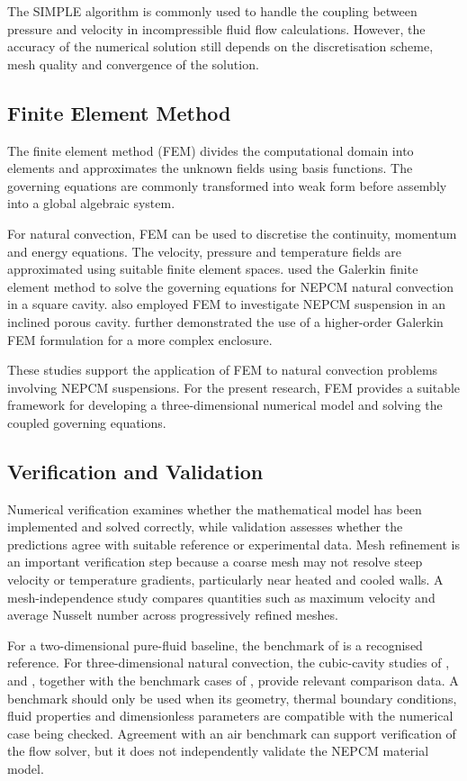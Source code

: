 The SIMPLE algorithm is commonly used to handle the coupling between pressure and velocity in incompressible fluid flow calculations. However, the accuracy of the numerical solution still depends on the discretisation scheme, mesh quality and convergence of the solution.

\subsection{Finite Element Method}

The finite element method (FEM) divides the computational domain into elements and approximates the unknown fields using basis functions. The governing equations are commonly transformed into weak form before assembly into a global algebraic system.

For natural convection, FEM can be used to discretise the continuity, momentum and energy equations. The velocity, pressure and temperature fields are approximated using suitable finite element spaces. \citet{ghalambaz2019} used the Galerkin finite element method to solve the governing equations for NEPCM natural convection in a square cavity. \citet{ghalambaz2020} also employed FEM to investigate NEPCM suspension in an inclined porous cavity. \citet{hussain2022} further demonstrated the use of a higher-order Galerkin FEM formulation for a more complex enclosure.

These studies support the application of FEM to natural convection problems involving NEPCM suspensions. For the present research, FEM provides a suitable framework for developing a three-dimensional numerical model and solving the coupled governing equations.

\subsection{Verification and Validation}

Numerical verification examines whether the mathematical model has been implemented and solved correctly, while validation assesses whether the predictions agree with suitable reference or experimental data. Mesh refinement is an important verification step because a coarse mesh may not resolve steep velocity or temperature gradients, particularly near heated and cooled walls. A mesh-independence study compares quantities such as maximum velocity and average Nusselt number across progressively refined meshes.

For a two-dimensional pure-fluid baseline, the benchmark of \citet{devahldavis1983} is a recognised reference. For three-dimensional natural convection, the cubic-cavity studies of \citet{fusegi1991}, \citet{tric2000} and \citet{wakashima2004}, together with the benchmark cases of \citet{bennett2006}, provide relevant comparison data. A benchmark should only be used when its geometry, thermal boundary conditions, fluid properties and dimensionless parameters are compatible with the numerical case being checked. Agreement with an air benchmark can support verification of the flow solver, but it does not independently validate the NEPCM material model.

